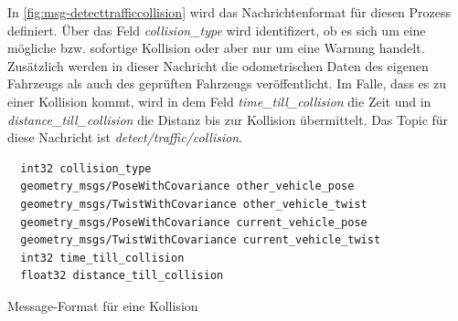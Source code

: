 In \ref{fig:msg-detecttrafficcollision} wird das Nachrichtenformat für diesen Prozess definiert. Über das Feld \textit{collision\_type} wird identifizert, ob es sich um eine mögliche bzw.
sofortige Kollision oder aber nur um eine Warnung handelt. Zusätzlich werden in dieser Nachricht die odometrischen Daten des eigenen Fahrzeugs als auch des geprüften Fahrzeugs 
veröffentlicht. Im Falle, dass es zu einer Kollision kommt, wird in dem Feld \textit{time\_till\_collision} die Zeit und in \textit{distance\_till\_collision} die Distanz bis zur Kollision
übermittelt. Das Topic für diese Nachricht ist \textit{detect/traffic/collision}.

\begin{code}
  \begin{verbatim}
  int32 collision_type
  geometry_msgs/PoseWithCovariance other_vehicle_pose
  geometry_msgs/TwistWithCovariance other_vehicle_twist
  geometry_msgs/PoseWithCovariance current_vehicle_pose
  geometry_msgs/TwistWithCovariance current_vehicle_twist
  int32 time_till_collision
  float32 distance_till_collision
  \end{verbatim}
  \caption{Message-Format für eine Kollision}
  \label{fig:msg-detecttrafficcollision}
\end{code}

